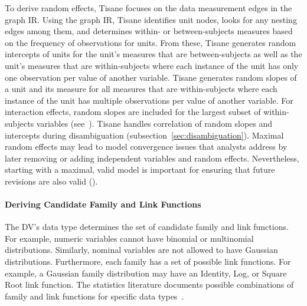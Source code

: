 To derive random effects, Tisane focuses on the data measurement edges in the
graph IR. Using the graph IR, Tisane identifies unit nodes, looks for any nesting
edges among them, and determines within- or between-subjects
measures based on the frequency of observations for units. %
From these, Tisane
generates random intercepts of units for the unit's measures that are between-subjects as well as the unit's measures that are within-subjects where each instance of the unit
has only one observation per value of another variable. Tisane generates random slopes of a unit and its measure for all measures
that are within-subjects where each instance of the unit has multiple
observations per value of another variable. For interaction effects, random
slopes are included for the largest subset of within-subjects variables (see~\cite{barr2013randomUpdated}). %
Tisane handles correlation of random slopes and intercepts during disambiguation (subsection~\ref{sec:disambiguation}).
Maximal random effects may lead to model convergence issues that analysts
address by later removing or adding independent variables and random effects. Nevertheless, starting with
a maximal, valid model is important for ensuring that future revisions are also valid (\dcValidity).

\paragraph{Deriving Candidate Family and Link Functions} \label{sec:family_link_functions}
The DV's data type determines the set of candidate family and
link functions. For example, numeric %
variables cannot have
binomial or multinomial distributions. Similarly, nominal variables are not
allowed to have Gaussian distributions. Furthermore, each family has a set of
possible link functions. For example, a Gaussian family distribution may have an
Identity, Log, or Square Root link function. The statistics literature documents
    possible combinations of family and link functions for specific data
types~\cite{nelder1972generalized}.


